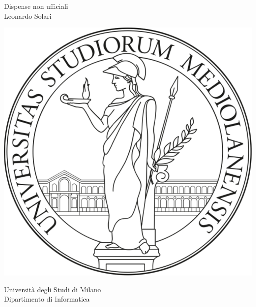 \documentclass[a4paper]{article}
\begin{document}
\begin{titlepage}
		\vspace{1.75\baselineskip} %
	{\large Dispense non ufficiali \\
		\vspace*{1.2\baselineskip}
	\huge Leonardo Solari} \\
	\vspace{70mm}
	\begin{center}
		\includegraphics[scale=0.07]{unimi.png}
	\end{center}
	\Large Università degli Studi di Milano \\
	\vspace{4mm}
	\large Dipartimento di Informatica
	\vfill
\end{titlepage}


\clearpage
\tableofcontents
\clearpage





\pagestyle{fancy}
\fancyhead[R]{\emph{\leftmark}}
\fancyhead[L]{\rightmark}
\end{document}
